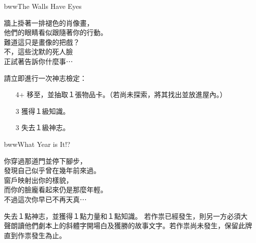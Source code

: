 \linebreak[0]%
\begin{EventCard}{bww}{The Walls Have Eyes}
  \begin{CardStory}
    牆上掛著一排褪色的肖像畫，\\
    他們的眼睛看似跟隨著你的行動。\\
    難道這只是畫像的把戲？\\
    不，這些沈默的死人臉\\
    正試著告訴你什麼事⋯
  \end{CardStory}
  請立即進行一次神志檢定：
  \begin{itemize}
    \item[4+] 移至，並抽取１張物品卡。（若尚未探索，將其找出並放進屋內。）
    \item[3] 獲得１級知識。
    \item[3] 失去１級神志。
  \end{itemize}
\end{EventCard}%
\linebreak[0]%
\begin{EventCard}{bww}{What Year is It!?}
  \begin{CardStory}
    你穿過那道門並停下腳步，\\
    發現自己似乎曾在幾年前來過。\\
    窗戶映射出你的樣貌，\\
    而你的臉龐看起來仍是那麼年輕。\\
    不過這次你早已不再天真⋯
  \end{CardStory}
  失去１點神志，並獲得１點力量和１點知識。\smallbreak
  若作祟已經發生，則另一方必須大聲朗讀他們劇本上的斜體字開場白及獲勝的故事文字。若作祟尚未發生，保留此牌直到作祟發生為止。\smallbreak
\end{EventCard}%
\linebreak[0]%
